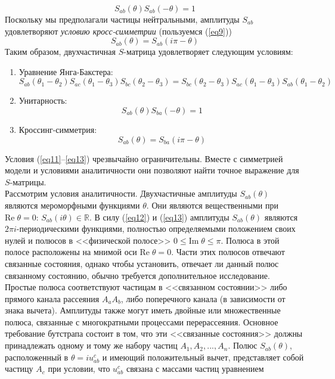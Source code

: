 \documentclass[12pt]{article}
\theoremstyle{definition}
\begin{document}
\begin{equation}
    S_{ab}(\theta)S_{ab}(-\theta)=1
\end{equation}
Поскольку мы предполагали частицы нейтральными, амплитуды $S_{ab}$ удовлетворяют \textit{условию кросс-симметрии} (пользуемся (\ref{eq9}))
\begin{equation}
    S_{ab}(\theta)=S_{ab}(i\pi-\theta)
\end{equation}
Таким образом, двухчастичная $S$-матрица удовлетворяет следующим условиям:
\begin{enumerate}
    \item Уравнение Янга-Бакстера:
    \begin{equation}\label{eq11}
        S_{ab}(\theta_1-\theta_2)S_{ac}(\theta_1-\theta_3)S_{bc}(\theta_2-\theta_3)=S_{bc}(\theta_2-\theta_3)S_{ac}(\theta_1-\theta_3)S_{ab}(\theta_1-\theta_2)
    \end{equation}
    \item Унитарность:
    \begin{equation}\label{eq12}
        S_{ab}(\theta)S_{ba}(-\theta)=1
    \end{equation}
    \item Кроссинг-симметрия:
    \begin{equation}\label{eq13}
        S_{ab}(\theta)=S_{ba}(i\pi-\theta)
    \end{equation}
\end{enumerate}
Условия (\ref{eq11}–\ref{eq13}) чрезвычайно ограничительны. Вместе с симметрией модели и условиями аналитичности они позволяют найти точное выражение для $S$-матрицы.\\
Рассмотрим условия аналитичности. Двухчастичные амплитуды $S_{ab}(\theta)$ являются мероморфными функциями $\theta$. Они являются вещественными при $\text{Re}\;\theta = 0$: $S_{ab}(i\theta)\in\mathbb{R}$. В силу (\ref{eq12}) и (\ref{eq13}) амплитуды $S_{ab}(\theta)$ являются $2\pi i$-периодическими функциями, полностью определяемыми положением своих нулей и полюсов в <<физической полосе>> $0\leq\text{Im}\;\theta\leq\pi$. Полюса в этой полосе расположены на мнимой оси $\text{Re}\;\theta = 0$. Части этих полюсов отвечают связанные состояния, однако чтобы установить, отвечает ли данный полюс связанному состоянию, обычно требуется дополнительное исследование.\\
Простые полюса соответствуют частицам в <<связанном состоянии>> либо прямого канала рассеяния $A_aA_b$, либо поперечного канала (в зависимости от знака вычета). Амплитуды также могут иметь двойные или множественные полюса, связанные с многократными процессами перерассеяния. Основное требование бутстрапа состоит в том, что эти <<связанные состояния>> должны принадлежать одному и тому же набору частиц $A_1, A_2, ..., A_n$. Полюс $S_{ab}(\theta)$, расположенный в $\theta = iu_{ab}^c$ и имеющий положительный вычет, представляет собой частицу $A_c$ при условии, что $u_{ab}^c$ связана с массами частиц уравнением
\end{document}
